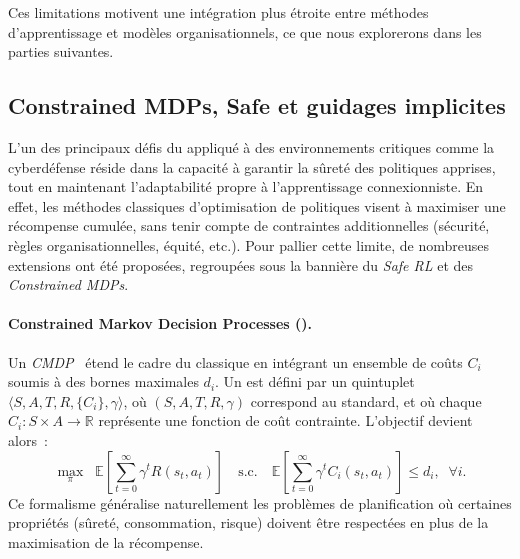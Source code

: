 Ces limitations motivent une intégration plus étroite entre méthodes d'apprentissage et modèles organisationnels, ce que nous explorerons dans les parties suivantes.



\subsection{Constrained MDPs, Safe  et guidages implicites}

\noindent
L’un des principaux défis du  appliqué à des environnements critiques
comme la cyberdéfense réside dans la capacité à garantir la sûreté des politiques apprises,
tout en maintenant l’adaptabilité propre à l’apprentissage connexionniste.
En effet, les méthodes classiques d’optimisation de politiques visent à maximiser une récompense cumulée,
sans tenir compte de contraintes additionnelles (sécurité, règles organisationnelles, équité, etc.).
Pour pallier cette limite, de nombreuses extensions ont été proposées, regroupées sous la bannière
du \textit{Safe RL} et des \textit{Constrained MDPs}.

\paragraph{Constrained Markov Decision Processes ().}
Un \textit{CMDP}~\cite{altman1999constrained} étend le cadre du  classique en intégrant
un ensemble de coûts $C_i$ soumis à des bornes maximales $d_i$.
Un  est défini par un quintuplet
$\langle S, A, T, R, \{C_i\}, \gamma \rangle$,
où $(S,A,T,R,\gamma)$ correspond au  standard, et où
chaque $C_i : S \times A \rightarrow \mathbb{R}$ représente une fonction de coût contrainte.
L’objectif devient alors~:
\[
  \max_{\pi} \;\; \mathbb{E}\!\left[\sum_{t=0}^\infty \gamma^t R(s_t,a_t)\right]
  \quad \text{s.c.} \quad
  \mathbb{E}\!\left[\sum_{t=0}^\infty \gamma^t C_i(s_t,a_t)\right] \leq d_i, \;\; \forall i.
\]
Ce formalisme généralise naturellement les problèmes de planification où certaines propriétés
(sûreté, consommation, risque) doivent être respectées en plus de la maximisation de la récompense.

